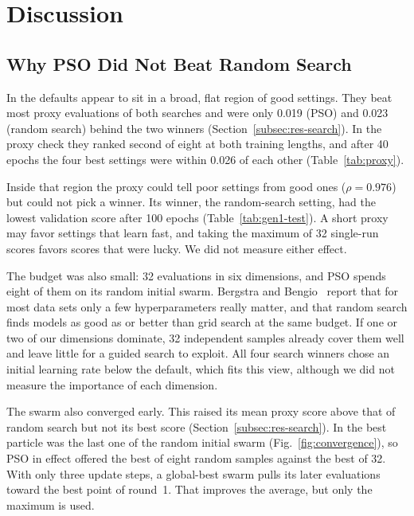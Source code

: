 \section{Discussion}
\label{sec:discussion}

\subsection{Why PSO Did Not Beat Random Search}
\label{subsec:why}

In \genone the defaults appear to sit in a broad, flat region of good settings. They beat most proxy evaluations of both searches and were only 0.019 (PSO) and 0.023 (random search) behind the two winners (Section~\ref{subsec:res-search}). In the proxy check they ranked second of eight at both training lengths, and after 40 epochs the four best settings were within 0.026 of each other (Table~\ref{tab:proxy}).

Inside that region the proxy could tell poor settings from good ones ($\rho = 0.976$) but could not pick a winner. Its \genone winner, the random-search setting, had the lowest validation score after 100 epochs (Table~\ref{tab:gen1-test}). A short proxy may favor settings that learn fast, and taking the maximum of 32 single-run scores favors scores that were lucky. We did not measure either effect.

The budget was also small: 32 evaluations in six dimensions, and PSO spends eight of them on its random initial swarm. Bergstra and Bengio~\cite{bergstra2012random} report that for most data sets only a few hyperparameters really matter, and that random search finds models as good as or better than grid search at the same budget. If one or two of our dimensions dominate, 32 independent samples already cover them well and leave little for a guided search to exploit. All four search winners chose an initial learning rate below the default, which fits this view, although we did not measure the importance of each dimension.

The swarm also converged early. This raised its mean proxy score above that of random search but not its best score (Section~\ref{subsec:res-search}). In \gentwo the best particle was the last one of the random initial swarm (Fig.~\ref{fig:convergence}), so PSO in effect offered the best of eight random samples against the best of 32. With only three update steps, a global-best swarm pulls its later evaluations toward the best point of round~1. That improves the average, but only the maximum is used.

